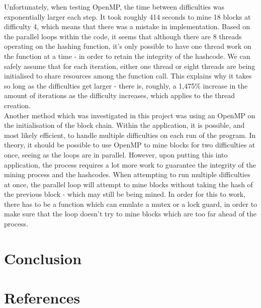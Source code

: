 \documentclass[12pt, a4paper]{article}
\begin{document}
Unfortunately, when testing OpenMP, the time between difficulties was exponentially larger each step. It took roughly 414 seconds to mine 18 blocks at difficulty 4, which means that there was a mistake in implementation. Based on the parallel loops within the code, it seems that although there are 8 threads operating on the hashing function, it's only possible to have one thread work on the function at a time - in order to retain the integrity of the hashcode. We can safely assume that for each iteration, either one thread or eight threads are being initialised to share resources among the function call. This explains why it takes so long as the difficulties get larger - there is, roughly, a 1,475\% increase in the amount of iterations as the difficulty increases, which applies to the thread creation. \\
Another method which was investigated in this project was using an OpenMP on the initialisation of the block chain. Within the application, it is possible, and most likely efficient, to handle multiple difficulties on each run of the program. In theory, it should be possible to use OpenMP to mine blocks for two difficulties at once, seeing as the loops are in parallel. However, upon putting this into application, the process requires a lot more work to guarantee the integrity of the mining process and the hashcodes. When attempting to run multiple difficulties at once, the parallel loop will attempt to mine blocks without taking the hash of the previous block - which may still be being mined. In order for this to work, there has to be a function which can emulate a mutex or a lock guard, in order to make sure that the loop doesn't try to mine blocks which are too far ahead of the process.

\section{Conclusion}

\section{References}
\end{document}
